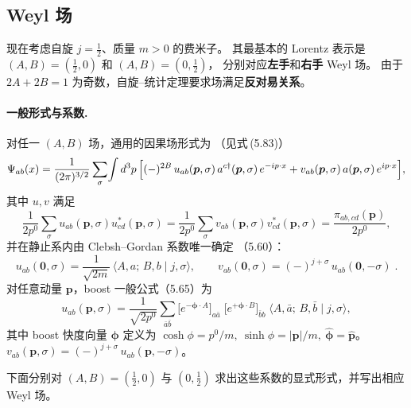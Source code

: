 
\subsection{Weyl 场}

现在考虑自旋 $j=\tfrac12$、质量 $m>0$ 的费米子。
其最基本的 Lorentz 表示是
\((A,B)=(\tfrac12,0)\) 和 \((A,B)=(0,\tfrac12)\)，
分别对应\textbf{左手}和\textbf{右手} Weyl 场。
由于 $2A+2B=1$ 为奇数，自旋–统计定理要求场满足\textbf{反对易关系}。

\paragraph{一般形式与系数.}
对任一 $(A,B)$ 场，通用的因果场形式为
（见式\,(5.83)）
\begin{equation}\label{eq:weyl-general}
  \Psi_{ab}(x) = \frac{1}{(2\pi)^{3/2}}\sum_{\sigma}\!\int d^{3}p\,
  \Bigl[(-)^{2B}\,u_{ab}(\boldsymbol{p},\sigma)\,a^{c\dagger}(\boldsymbol{p},\sigma)\,e^{-ip\cdot x}
        + v_{ab}(\boldsymbol{p},\sigma)\,a(\boldsymbol{p},\sigma)\,e^{ip\cdot x}\Bigr],
\end{equation}
其中 $u,v$ 满足
\[
\frac{1}{2p^{0}}\sum_{\sigma}u_{ab}(\boldsymbol{p},\sigma)u^{*}_{cd}(\boldsymbol{p},\sigma)
=\frac{1}{2p^{0}}\sum_{\sigma}v_{ab}(\boldsymbol{p},\sigma)v^{*}_{cd}(\boldsymbol{p},\sigma)
= \frac{\pi_{ab,cd}(\boldsymbol{p})}{2p^{0}},
\]
并在静止系内由 Clebsh–Gordan 系数唯一确定
（5.60）：
\begin{equation}\label{eq:weyl-u0}
  u_{ab}(\mathbf{0},\sigma) = \frac{1}{\sqrt{2m}}
  \,\langle A,a;\,B,b\mid j,\sigma\rangle,\qquad
  v_{ab}(\mathbf{0},\sigma)=(-)^{j+\sigma}\,u_{ab}(\mathbf{0},-\sigma)\;.
\end{equation}
对任意动量 $\boldsymbol{p}$，boost 一般公式（5.65）为
\begin{equation}\label{eq:weyl-uboost}
  u_{ab}(\boldsymbol{p},\sigma)
  = \frac{1}{\sqrt{2p^{0}}}
  \sum_{\bar{a}\bar{b}}
  \bigl[e^{-\boldsymbol{\phi}\cdot A}\bigr]_{a\bar{a}}\;
  \bigl[e^{+\boldsymbol{\phi}\cdot B}\bigr]_{\bar{b}b}\;
  \langle A,\bar{a};\,B,\bar{b}\mid j,\sigma\rangle,
\end{equation}
其中 boost 快度向量 $\boldsymbol{\phi}$ 定义为
$\cosh\phi=p^{0}/m,\ \sinh\phi=|\boldsymbol{p}|/m,\
\hat{\boldsymbol{\phi}}=\hat{\boldsymbol{p}}$。
$v_{ab}(\boldsymbol{p},\sigma)=(-)^{j+\sigma}\,u_{ab}(\boldsymbol{p},-\sigma)$。

下面分别对 $(A,B)=(\tfrac12,0)$ 与 $(0,\tfrac12)$
求出这些系数的显式形式，并写出相应 Weyl 场。

